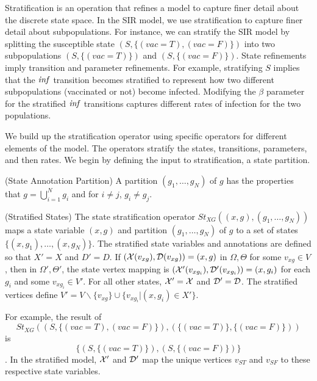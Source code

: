 Stratification is an operation that refines a model to capture finer detail about the discrete state space.
In the SIR model, we use stratification to capture finer detail about subpopulations.  For instance, we can stratify the SIR model by splitting the susceptible state $(S, \{(vac=T), (vac=F)\})$ into two subpopulations $(S, \{(vac=T)\})$ and $(S, \{(vac=F)\})$.  State refinements imply transition and parameter refinements.  For example, stratifying $S$ implies that the $\mathit{inf}$ transition becomes stratified to represent how two different subpopulations (vaccinated or not) become infected.  Modifying the $\beta$ parameter for the stratified $\mathit{inf}$ transitions captures different rates of infection for the two populations.

We build up the stratification operator using specific operators for different elements of the model.  The operators stratify the states, transitions, parameters, and then rates.  We begin by defining the input to stratification, a state partition.

\begin{definition} (State Annotation Partition)
	A partition $(g_1, \ldots, g_N)$ of $g$ has the properties that $g=\bigcup_{i=1}^N g_i$ and for $i \not=j$, $g_i \not=g_j$.
\end{definition}



\begin{definition} (Stratified States)\label{def:state-stratify}
	The state stratification operator $St_{XG}((x, g), (g_1, \ldots, g_N))$ maps a state variable $(x, g)$ and partition $(g_1, \ldots, g_N)$ of $g$ to a set of states $\{(x, g_1), \ldots, (x, g_N)\}$.  The stratified state variables and annotations are defined so that $X' = X$ and $D'=D$.  If $({\cal X}(v_{xg}),{\cal D}(v_{xg})) = (x, g)$ in $\Omega, \Theta$ for some $v_{xg} \in V$, then in $\Omega', \Theta'$, the state vertex mapping is $({\cal X}'(v_{xg_i}),{\cal D}'(v_{xg_i})) = (x, g_i)$ for each $g_i$ and some $v_{xg_i} \in V'$.  For all other states, ${\cal X}' = {\cal X}$ and ${\cal D}' = {\cal D}$.  The stratified vertices define $V' = V\backslash\{v_{xg}\} \cup \{v_{xg_i} | (x, g_i) \in X'\}$.
\end{definition}

For example, the result of $$St_{XG}((S, \{(vac=T), (vac=F)\}), (\{(vac=T)\}, \{(vac=F)\}))$$ is $$\{(S, \{(vac=T)\}), (S, \{(vac=F)\})\}$$.  In the stratified model, ${\cal X}'$ and ${\cal D}'$ map the unique vertices $v_{ST}$ and $v_{SF}$ to these respective state variables.

